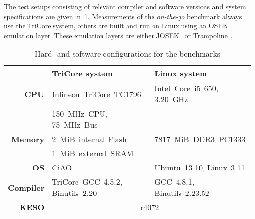 	The test setups consisting of relevant compiler and software versions and system specifications are given
	in~\cref{tbl:eval:setup}. Measurements of the \emph{on-the-go} benchmark always use the TriCore system, others are
	built and run on Linux using an OSEK emulation layer. These emulation layers are either JOSEK~\cite{josek:10} or
	Trampoline~\cite{bechennec:06:etfa}.

	\begin{table}
		\centering
		\begin{tabular}{rll}
				& \textbf{TriCore system} & \textbf{Linux system}\\\hline\hline
			\multirow{1}{*}{\textbf{CPU}} &
				  Infineon~TriCore~TC1796 & Intel~Core~i5~650, 3.20~GHz\\
				& 150~MHz~CPU, 75~MHz~Bus & \\
			\multirow{1}{*}{\textbf{Memory}} &
				  2~MiB~internal Flash & 7817~MiB~DDR3~PC1333\\
				& 1~MiB~external~SRAM & \\
			\textbf{OS} &
				CiAO~\textttt{4c19874} & Ubuntu~13.10, Linux~3.11\\
			\textbf{Compiler} &
				TriCore~GCC~4.5.2, Binutils~2.20 & GCC~4.8.1, Binutils~2.23.52\\
			\textbf{KESO} &
				\multicolumn{2}{c}{r4072}
		\end{tabular}

		\caption{Hard- and software configurations for the benchmarks}
		\label{tbl:eval:setup}
	\end{table}

